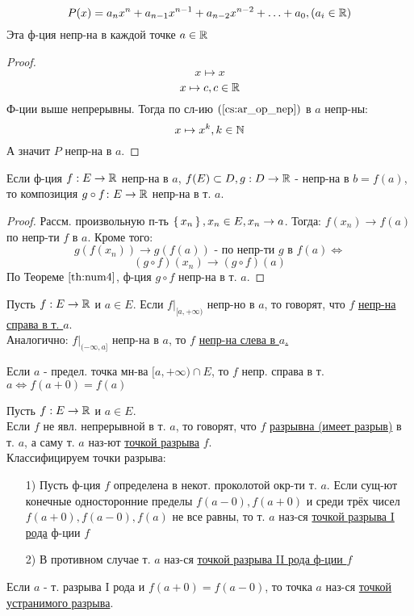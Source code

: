 \begin{example}
\[
P(x) = a_n x^{n} + a_{n - 1}x^{n - 1} + a_{n - 2}x^{n - 2} + \ldots + a_0, (a_i \in \mathbb{R})
\]
Эта ф-ция непр-на в каждой точке $a \in \mathbb{R}$
\end{example}
\begin{proof}
\[
x \mapsto x
\]
\[
x \mapsto c, c \in \mathbb{R}
\]
Ф-ции выше непрерывны. Тогда по сл-ию $(\ref{cs:ar_op_nep})$ в $a$ непр-ны:
\[
  x \mapsto x^{k}, k \in \mathbb{N}
\]
А значит $P$ непр-на в $a$.
\end{proof}
\begin{theorem}
  \label{th:nepr_comp}
Если ф-ция $f: E \rightarrow \mathbb{R}$ непр-на в $a$, $f(E) \subset D, g: D \rightarrow \mathbb{R}$ - непр-на в $b = f(a)$, то композиция $g \circ f \colon E \rightarrow \mathbb{R}$ непр-на в т. $a$.
\end{theorem}
\begin{proof}
  Рассм. произвольную п-ть $\set{x_n}, x_n \in E, x_n \rightarrow a$. Тогда: $f(x_n) \rightarrow f(a)$ по непр-ти $f$ в $a$. Кроме того:
  \[
  g(f(x_n)) \rightarrow g(f(a)) \text{ - по непр-ти $g$ в $f(a)$} \iff
  \]
  \[
    (g \circ f)(x_n) \rightarrow (g \circ f)(a)
  \]
  По Теореме $\ref{th:num4}$, ф-ция $g \circ f$ непр-на в т. $a$.
\end{proof}
\begin{definition}
Пусть $f: E \rightarrow \mathbb{R}$ и $a \in E$. Если $f|_{[a, +\infty)}$ непр-но в $a$, то говорят, что $f$ \underline{непр-на справа в т. $a$}. \\

Аналогично: $f|_{(-\infty, a]}$ непр-на в $a$, то $f$ \underline{непр-на слева в $a$.}
\end{definition}
\begin{note}
Если $a$ - предел. точка мн-ва $[a, +\infty) \cap E$, то $f$ непр. справа в т. $a \iff f(a + 0) = f(a)$
\end{note}
\begin{definition}
  Пусть $f: E \rightarrow \mathbb{R}$ и $a \in E$.\\
  Если $f$ не явл. непрерывной в т. $a$, то говорят, что $f$ \underline{разрывна (имеет разрыв)} в т. $a$, а саму т. $a$ наз-ют \underline{точкой разрыва} $f$. \\
  Классифицируем точки разрыва:
  \begin{itemize}
    \item [1) ] Пусть ф-ция $f$ определена в некот. проколотой окр-ти т. $a$. Если сущ-ют конечные односторонние пределы $f(a - 0), f(a + 0)$ и среди трёх чисел $f(a + 0), f(a - 0), f(a)$ не все равны, то т. $a$ наз-ся \underline{точкой разрыва I рода} ф-ции $f$
    \item [2) ] В противном случае т. $a$ наз-ся \underline{точкой разрыва II рода ф-ции $f$}
  \end{itemize}
  Если $a$ - т. разрыва I рода и $f(a + 0) = f(a - 0)$, то точка $a$ наз-ся \underline{точкой устранимого разрыва}.
\end{definition}

